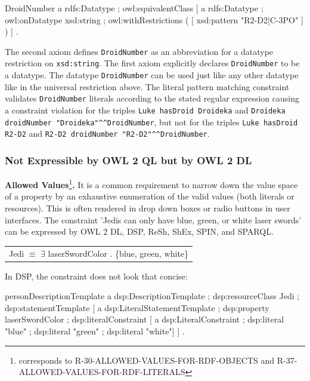 \documentclass{llncs}
\newcommand{\ms}[1]{\texttt{#1}}
\newenvironment{DL}{
  \scriptsize
  \sffamily
  \vspace{0.3cm}
  \begin{tabular}{l}

}{
  \end{tabular}
  \linebreak
}
\begin{document}
\begin{ex}
DroidNumber 
    a rdfs:Datatype ;
    owl:equivalentClass [
        a rdfs:Datatype ;
        owl:onDatatype xsd:string ;
        owl:withRestrictions ( 
            [ xsd:pattern "R2-D2|C-3PO" ] ) ] .
\end{ex}

The second axiom defines \ms{DroidNumber} as an abbreviation for a datatype restriction on \ms{xsd:string}. 
The first axiom explicitly declares \ms{DroidNumber} to be a datatype. 
The datatype \ms{DroidNumber} can be used just like any other datatype like in the universal restriction above.
The literal pattern matching constraint validates \ms{DroidNumber} literals according to the stated regular expression causing a constraint violation for the triples 
\ms{Luke hasDroid Droideka} and \ms{Droideka droidNumber "Droideka"\textasciicircum{}\textasciicircum{}DroidNumber}, 
but not for the triples \ms{Luke hasDroid R2-D2} and \ms{R2-D2 droidNumber "R2-D2"\textasciicircum{}\textasciicircum{}DroidNumber}.

\subsubsection{Not Expressible by OWL 2 QL but by OWL 2 DL}

\textbf{Allowed Values}\footnote{corresponds to R-30-ALLOWED-VALUES-FOR-RDF-OBJECTS and R-37-ALLOWED-VALUES-FOR-RDF-LITERALS}\textbf{.}
It is a common requirement to narrow down the value space of a property by an exhaustive enumeration of the valid values (both literals or resources). This is often rendered in drop down boxes or radio buttons in user interfaces. 
The constraint 'Jedis can only have blue, green, or white laser swords' can be expressed by OWL 2 DL, DSP, ReSh, ShEx, SPIN, and SPARQL.

\begin{DL}
Jedi $\equiv$ $\exists$ laserSwordColor . \{blue, green, white\} \\
\end{DL}

In DSP, the constraint does not look that concise:

\begin{ex}
personDescriptionTemplate
    a dsp:DescriptionTemplate ;
    dsp:resourceClass Jedi ;
    dsp:statementTemplate [
        a dsp:LiteralStatementTemplate ;
        dsp:property laserSwordColor ;
        dsp:literalConstraint [
            a dsp:LiteralConstraint ;
            dsp:literal "blue" ;
            dsp:literal "green" ;
            dsp:literal "white"] ] .
\end{ex}
\end{document}
